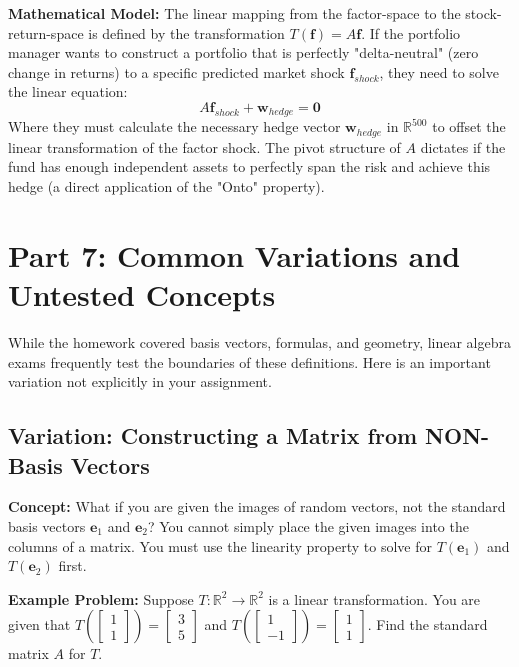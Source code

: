 \documentclass[11pt]{article}
\begin{document}
\textbf{Mathematical Model:}
The linear mapping from the factor-space to the stock-return-space is defined by the transformation $T(\mathbf{f}) = A\mathbf{f}$.
If the portfolio manager wants to construct a portfolio that is perfectly "delta-neutral" (zero change in returns) to a specific predicted market shock $\mathbf{f}_{shock}$, they need to solve the linear equation:
\[ A\mathbf{f}_{shock} + \mathbf{w}_{hedge} = \mathbf{0} \]
Where they must calculate the necessary hedge vector $\mathbf{w}_{hedge}$ in $\mathbb{R}^{500}$ to offset the linear transformation of the factor shock. The pivot structure of $A$ dictates if the fund has enough independent assets to perfectly span the risk and achieve this hedge (a direct application of the "Onto" property).

\newpage
\section{Part 7: Common Variations and Untested Concepts}

While the homework covered basis vectors, formulas, and geometry, linear algebra exams frequently test the boundaries of these definitions. Here is an important variation not explicitly in your assignment.

\subsection{Variation: Constructing a Matrix from NON-Basis Vectors}
\textbf{Concept:} What if you are given the images of random vectors, not the standard basis vectors $\mathbf{e}_1$ and $\mathbf{e}_2$? You cannot simply place the given images into the columns of a matrix. You must use the linearity property to solve for $T(\mathbf{e}_1)$ and $T(\mathbf{e}_2)$ first.

\textbf{Example Problem:}
Suppose $T: \mathbb{R}^2 \to \mathbb{R}^2$ is a linear transformation. You are given that $T\left( \begin{bmatrix} 1 \\ 1 \end{bmatrix} \right) = \begin{bmatrix} 3 \\ 5 \end{bmatrix}$ and $T\left( \begin{bmatrix} 1 \\ -1 \end{bmatrix} \right) = \begin{bmatrix} 1 \\ 1 \end{bmatrix}$. Find the standard matrix $A$ for $T$.
\end{document}

